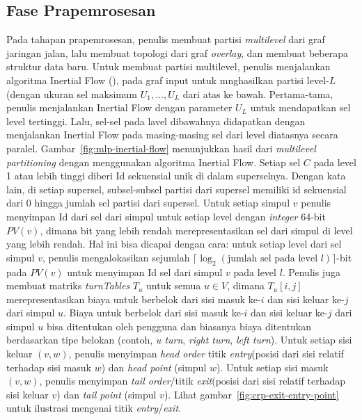 \subsection{Fase Prapemrosesan}
\label{subsec:tdcrp-preprocessing}
Pada tahapan prapemrosesan, penulis membuat partisi \textit{multilevel} dari graf jaringan jalan, lalu membuat topologi dari graf \textit{overlay}, dan membuat beberapa struktur data baru. Untuk membuat partisi multilevel, penulis menjalankan algoritma Inertial Flow (\cite{Schild2015}), pada graf input untuk mnghasilkan partisi level-$L$ (dengan ukuran sel maksimum $U_1,\ldots, U_{L}$ dari atas ke bawah. Pertama-tama, penulis menjalankan Inertial Flow dengan parameter $U_L$ untuk mendapatkan sel level tertinggi. Lalu, sel-sel pada lavel dibawahnya didapatkan dengan menjalankan Inertial Flow pada masing-masing sel dari level diatasnya secara paralel. Gambar~\ref{fig:mlp-inertial-flow} menunjukkan hasil dari \textit{multilevel partitioning} dengan menggunakan algoritma Inertial Flow. Setiap sel $C$ pada level 1 atau lebih tinggi diberi Id sekuensial unik di dalam superselnya. Dengan kata lain, di setiap supersel, subsel-subsel partisi dari supersel memiliki id sekuensial dari 0 hingga jumlah sel partisi dari supersel. Untuk setiap simpul $v$ penulis menyimpan Id dari sel dari simpul untuk setiap level dengan \textit{integer} 64-bit $PV(v)$, dimana bit yang lebih rendah merepresentasikan sel dari simpul di level yang lebih rendah. Hal ini bisa dicapai dengan cara: untuk setiap level dari sel simpul $v$, penulis mengalokasikan sejumlah $\lceil \log_2(\text{jumlah sel pada level } l) \rceil$-bit pada $PV(v)$ untuk menyimpan Id sel dari simpul $v$ pada level $l$. Penulis juga membuat matriks \textit{turnTables} $T_u$ untuk semua $u\in V$, dimana $T_u[i,j]$ merepresentasikan biaya untuk berbelok dari sisi masuk ke-$i$ dan sisi keluar ke-$j$ dari simpul $u$. Biaya untuk berbelok dari sisi masuk ke-$i$ dan sisi keluar ke-$j$ dari simpul $u$ bisa ditentukan oleh pengguna dan biasanya biaya ditentukan berdasarkan tipe belokan (contoh, \textit{u turn},  \textit{right turn}, \textit{left turn}). Untuk setiap sisi keluar $(v,w)$, penulis menyimpan \textit{head order} titik \textit{entry}(posisi dari sisi relatif terhadap sisi masuk $w$) dan \textit{head point} (simpul $w$). Untuk setiap sisi masuk $(v,w)$, penulis menyimpan \textit{tail order}/titik \textit{exit}(posisi dari sisi relatif terhadap sisi keluar $v$) dan \textit{tail point} (simpul $v$). Lihat gambar~\ref{fig:crp-exit-entry-point} untuk ilustrasi mengenai titik \textit{entry}/\textit{exit}.

